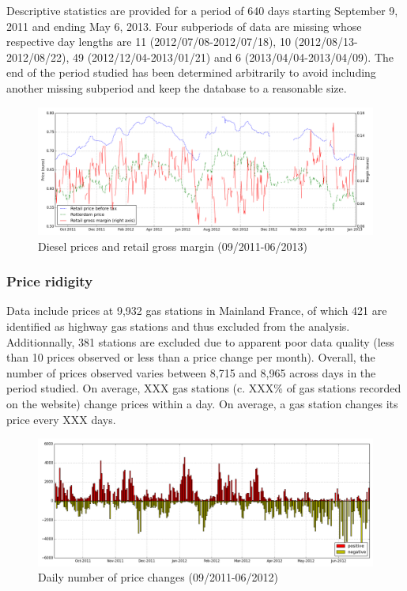\documentclass[11pt]{article}
\begin{document}
Descriptive statistics are provided for a period of 640 days starting September 9, 2011 and ending May 6, 2013. Four subperiods of data are missing whose respective day lengths are 11 (2012/07/08-2012/07/18), 10 (2012/08/13-2012/08/22), 49 (2012/12/04-2013/01/21) and 6 (2013/04/04-2013/04/09). The end of the period studied has been determined arbitrarily to avoid including another missing subperiod and keep the database to a reasonable size.

\begin{figure}[!h]
    \caption{Diesel prices and retail gross margin (09/2011-06/2013)}
	\centering
		\includegraphics[width=16cm]{graphs/diesel_price_margin.png}
\end{figure}

\subsubsection{Price ridigity}

Data include prices at 9,932 gas stations in Mainland France, of which 421 are identified as highway gas stations and thus excluded from the analysis. Additionnally, 381 stations are excluded due to apparent poor data quality (less than 10 prices observed or less than a price change per month). Overall, the number of prices observed varies between 8,715 and 8,965 across days in the period studied. On average, XXX gas stations (c. XXX\% of gas stations recorded on the website) change prices within a day. On average, a gas station changes its price every XXX days.

\begin{figure}[!h]
    \caption{Daily number of price changes (09/2011-06/2012)}
	\centering
		\includegraphics[width=16cm]{graphs/diesel_nb_price_chges.png}
\end{figure}
\end{document}
